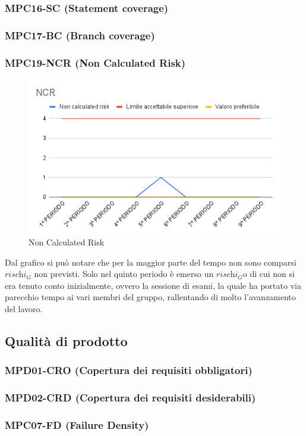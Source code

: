 \subsubsection{MPC16-SC (Statement coverage)}
\subsubsection{MPC17-BC (Branch coverage)}
\subsubsection{MPC19-NCR (Non Calculated Risk)}
\begin{figure}[H]
  \centering
  \includegraphics[width=0.7\linewidth]{grafici/NCR.png}
  \caption{Non Calculated Risk}
\end{figure}
Dal grafico si può notare che per la maggior parte del tempo non sono comparsi $\textit{rischi}_G$ non previsti. Solo nel quinto periodo è emerso un $\textit{rischi}_G$o di cui non si era tenuto conto inizialmente, ovvero la sessione di esami, la quale ha portato via parecchio tempo ai vari membri del gruppo, rallentando di molto l'avanzamento del lavoro.
\subsection{Qualità di prodotto}
\subsubsection{MPD01-CRO (Copertura dei requisiti obbligatori)}
\subsubsection{MPD02-CRD (Copertura dei requisiti desiderabili)}
\subsubsection{MPC07-FD (Failure Density)}
